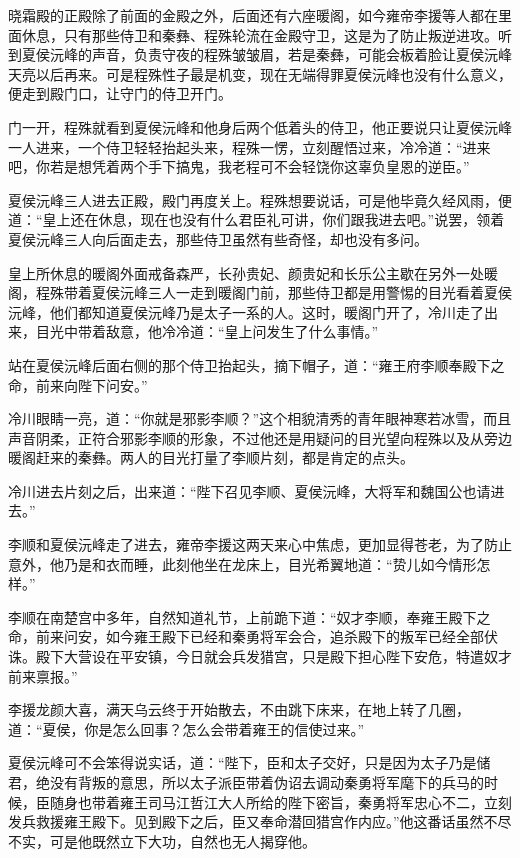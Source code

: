 晓霜殿的正殿除了前面的金殿之外，后面还有六座暖阁，如今雍帝李援等人都在里面休息，只有那些侍卫和秦彝、程殊轮流在金殿守卫，这是为了防止叛逆进攻。听到夏侯沅峰的声音，负责守夜的程殊皱皱眉，若是秦彝，可能会板着脸让夏侯沅峰天亮以后再来。可是程殊性子最是机变，现在无端得罪夏侯沅峰也没有什么意义，便走到殿门口，让守门的侍卫开门。

门一开，程殊就看到夏侯沅峰和他身后两个低着头的侍卫，他正要说只让夏侯沅峰一人进来，一个侍卫轻轻抬起头来，程殊一愣，立刻醒悟过来，冷冷道：“进来吧，你若是想凭着两个手下搞鬼，我老程可不会轻饶你这辜负皇恩的逆臣。”

夏侯沅峰三人进去正殿，殿门再度关上。程殊想要说话，可是他毕竟久经风雨，便道：“皇上还在休息，现在也没有什么君臣礼可讲，你们跟我进去吧。”说罢，领着夏侯沅峰三人向后面走去，那些侍卫虽然有些奇怪，却也没有多问。

皇上所休息的暖阁外面戒备森严，长孙贵妃、颜贵妃和长乐公主歇在另外一处暖阁，程殊带着夏侯沅峰三人一走到暖阁门前，那些侍卫都是用警惕的目光看着夏侯沅峰，他们都知道夏侯沅峰乃是太子一系的人。这时，暖阁门开了，冷川走了出来，目光中带着敌意，他冷冷道：“皇上问发生了什么事情。”

站在夏侯沅峰后面右侧的那个侍卫抬起头，摘下帽子，道：“雍王府李顺奉殿下之命，前来向陛下问安。”

冷川眼睛一亮，道：“你就是邪影李顺？”这个相貌清秀的青年眼神寒若冰雪，而且声音阴柔，正符合邪影李顺的形象，不过他还是用疑问的目光望向程殊以及从旁边暖阁赶来的秦彝。两人的目光打量了李顺片刻，都是肯定的点头。

冷川进去片刻之后，出来道：“陛下召见李顺、夏侯沅峰，大将军和魏国公也请进去。”

李顺和夏侯沅峰走了进去，雍帝李援这两天来心中焦虑，更加显得苍老，为了防止意外，他乃是和衣而睡，此刻他坐在龙床上，目光希翼地道：“贽儿如今情形怎样。”

李顺在南楚宫中多年，自然知道礼节，上前跪下道：“奴才李顺，奉雍王殿下之命，前来问安，如今雍王殿下已经和秦勇将军会合，追杀殿下的叛军已经全部伏诛。殿下大营设在平安镇，今日就会兵发猎宫，只是殿下担心陛下安危，特遣奴才前来禀报。”

李援龙颜大喜，满天乌云终于开始散去，不由跳下床来，在地上转了几圈，道：“夏侯，你是怎么回事？怎么会带着雍王的信使过来。”

夏侯沅峰可不会笨得说实话，道：“陛下，臣和太子交好，只是因为太子乃是储君，绝没有背叛的意思，所以太子派臣带着伪诏去调动秦勇将军麾下的兵马的时候，臣随身也带着雍王司马江哲江大人所给的陛下密旨，秦勇将军忠心不二，立刻发兵救援雍王殿下。见到殿下之后，臣又奉命潜回猎宫作内应。”他这番话虽然不尽不实，可是他既然立下大功，自然也无人揭穿他。

